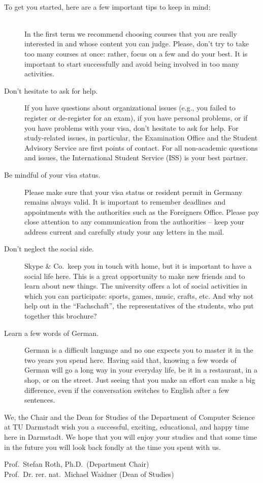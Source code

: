 {\

To get you started, here are a few important tips to keep in mind:
\\ \\
\begin{description}
\item[\parbox{\textwidth}{Be focused in your studies, but not over- \\
ambitious.}] 
  In the first term we recommend choosing courses that you are really interested in and whose content you can judge. 
  Please, don't try to take too many courses at once: rather, focus on a few and do your best. 
  It is important to start successfully and avoid being involved in too many activities.
\item[Don't hesitate to ask for help.] 
  If you have questions about organizational issues (e.g., you failed to register or de-register for an exam), if you have personal problems, or if you have problems with your visa, don't hesitate to ask for help.
  For study-related issues, in particular, the Examination Office and the Student Advisory Service are first points of contact.
  For all non-academic questions and issues, the International Student Service (ISS) is your best partner.  
\item[Be mindful of your visa status.] 
  Please make sure that your visa status or resident permit in Germany remains always valid.
  It is important to remember deadlines and appointments with the authorities such as the Foreigners Office. 
  Please pay close attention to any communication from the authorities -- keep your address current and carefully study your any letters in the mail.
\item[Don't neglect the social side.] 
  Skype \& Co.\ keep you in touch with home, but it is important to have a social life here.
  This is a great opportunity to make new friends and to learn about new things.
  The university offers a lot of social activities in which you can participate: sports, games, music, crafts, etc. 
  And why not help out in the ``Fachschaft'', the representatives of the students, who put together this brochure?
\item[Learn a few words of German.]
  German is a difficult language and no one expects you to master it in the two years you spend here.
  Having said that, knowing a few words of German will go a long way in your everyday life, be it in a restaurant, in a shop, or on the street.
  Just seeing that you make an effort can make a big difference, even if the conversation switches to English after a few sentences.
\end{description}

We, the Chair and the Dean for Studies of the Department of Computer Science at TU Darmstadt wish you a successful, exciting, educational, and happy time here in Darmstadt.
We hope that you will enjoy your studies and that some time in the future you will look back fondly at the time you spent with us.

}{Prof.~Stefan Roth, Ph.D.~(Department Chair)\\ Prof.~Dr. rer. nat.~Michael Waidner (Dean of Studies)}